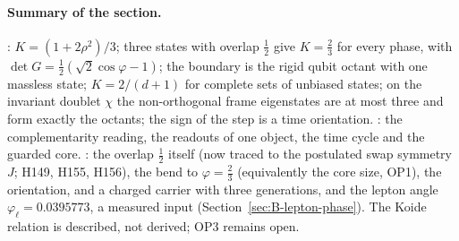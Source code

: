 \paragraph{Summary of the section.}
\Established: $K=(1+2\rho^2)/3$; three states with overlap $\tfrac12$ give $K=\tfrac23$ for every phase, with
$\det G=\tfrac12(\sqrt2\cos\varphi-1)$; the boundary is the rigid qubit octant with one massless state; $K=2/(d+1)$ for
complete sets of unbiased states; on the invariant doublet $\chi$ the non-orthogonal frame eigenstates are at most three
and form exactly the octants; the sign of the step is a time orientation. \Reading: the complementarity reading, the
readouts of one object, the time cycle and the guarded core. \Open: the overlap $\tfrac12$ itself (now traced to the postulated
swap symmetry $J$; H149, H155, H156), the bend to
$\varphi=\tfrac23$ (equivalently the core size, OP1), the orientation, and a charged carrier with three generations, and the
lepton angle $\varphi_\ell=0.0395773$, a measured input (Section~\ref{sec:B-lepton-phase}). The
Koide relation is described, not derived; OP3 remains open.
